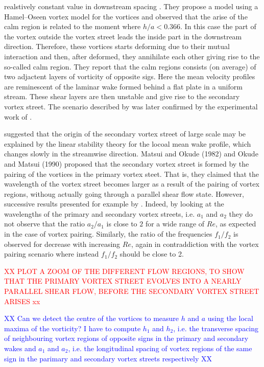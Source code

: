realstively constant value in downstream spacing \citep{schaefer-eskinazi-1959}. They propose a model using a Hamel--Oseen vortex model for the vortices and observed that the arise of the calm region is related to the moment where $h/a<0.366$. In this case the part of the vortex outside the vortex street leads the inside part in the downstream direction. Therefore, these vortices starts deforming due to their mutual interaction and then, after deformed, they annihilate each other giving rise to the so-called calm region. They report that the calm regions consists (on average) of two adjactent layers of vorticity of opposite sigs. Here the mean velocity profiles are reminescent of the laminar wake formed behind a flat plate in a uniform stream. These shear layers are then unstable and give rise to the secondary vortex street. The scenario described by \cite{durgin-karlsson-1971} was later confirmed by the experimental work of \cite{karasudani-funakoshi-1994}.

\cite{taneda-1959} suggested that the origin of the secondary vortex street of large scale may be explained by the linear stability theory for the locoal mean wake profile, which changes slowly in the streamwise direction. Matsui and Okude (1982) and Okude and Matsui (1990) proposed that the secondary vortex street is formed by the pairing of the vortices in the primary vortex steet. That is, they claimed that the wavelength of the vortex street becomes larger as a result of the pairing of vortex regions, withoug actually going through a parallel shear flow state. However, successive results presented for example by \cite{karasudani-funakoshi-1994}. Indeed, by looking at the wavelengths of the primary and secondary vortex streets, i.e. $a_1$ and $a_2$ they do not observe that the ratio $a_2/a_1$ is close to $2$ for a wide range of $Re$, as expected in the case of vortex pairing. Similarly, the ratio of the frequencies $f_1/f_2$ is observed for decrease with increasing $Re$, again in contraddiction with the vortex pairing scenario where instead $f_1/f_2$ should be close to 2. 

\textcolor{red}{XX PLOT A ZOOM OF THE DIFFERENT FLOW REGIONS, TO SHOW THAT THE PRIMARY VORTEX STREET EVOLVES INTO A NEARLY PARALLEL SHEAR FLOW, BEFORE THE SECONDARY VORTEX STREET ARISES xx}

\textcolor{blue}{XX Can we detect the centre of the vortices to measure $h$ and $a$ using the local maxima of the vorticity?  I have to compute $h_1$ and $h_2$, i.e. the transverse spacing of neighbouring vortex regions of opposite signs in the primary and secondary wakes and $a_1$ and $a_2$, i.e. the longitudinal spacing of vortex regions of the same sign in the parimary and secondary vortex streets respectively XX} 


